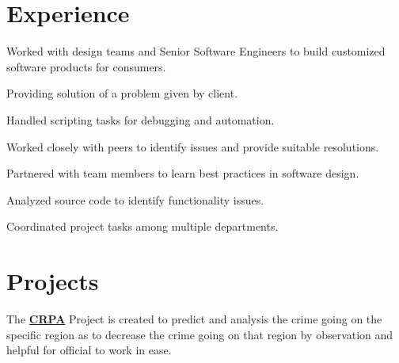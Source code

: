 \documentclass[]{rohan-resume-openfont}
\begin{document}
\begin{minipage}[t]{0.66\textwidth} 


\section{Experience}
\sectionsep

\vspace{\topsep} %
\begin{tightemize}
\item Worked with design teams and Senior Software Engineers to build   customized software products for consumers.
\item Providing solution of a problem given by client.
\item Handled scripting tasks for debugging and automation.
\item Worked closely with peers to identify issues and provide suitable resolutions.
\item Partnered with team members to learn best practices in software design.
\item Analyzed source code to identify functionality issues.
\item Coordinated project tasks among multiple departments.

\end{tightemize}

\sectionsep


\section{Projects}
 The \textbf{\href{https://github.com/rp520671/Crime}{CRPA}} Project is created to predict and analysis the crime going on the specific region as to decrease the crime going on that region by observation and helpful for official to work in ease.  
\sectionsep


\end{minipage}
\end{document}
